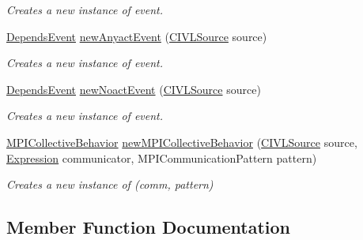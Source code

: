 \begin{DoxyCompactItemize}
\begin{DoxyCompactList}\small\item\em Creates a new instance of {\ttfamily } event. \end{DoxyCompactList}\item 
\hyperlink{interfaceedu_1_1udel_1_1cis_1_1vsl_1_1civl_1_1model_1_1IF_1_1contract_1_1DependsEvent}{Depends\+Event} \hyperlink{classedu_1_1udel_1_1cis_1_1vsl_1_1civl_1_1model_1_1common_1_1contract_1_1CommonContractFactory_a6c45f87fdea960118fca3767f21ee687}{new\+Anyact\+Event} (\hyperlink{interfaceedu_1_1udel_1_1cis_1_1vsl_1_1civl_1_1model_1_1IF_1_1CIVLSource}{C\+I\+V\+L\+Source} source)
\begin{DoxyCompactList}\small\item\em Creates a new instance of {\ttfamily } event. \end{DoxyCompactList}\item 
\hyperlink{interfaceedu_1_1udel_1_1cis_1_1vsl_1_1civl_1_1model_1_1IF_1_1contract_1_1DependsEvent}{Depends\+Event} \hyperlink{classedu_1_1udel_1_1cis_1_1vsl_1_1civl_1_1model_1_1common_1_1contract_1_1CommonContractFactory_a55afb1244554d09602b70b8c064afbd2}{new\+Noact\+Event} (\hyperlink{interfaceedu_1_1udel_1_1cis_1_1vsl_1_1civl_1_1model_1_1IF_1_1CIVLSource}{C\+I\+V\+L\+Source} source)
\begin{DoxyCompactList}\small\item\em Creates a new instance of {\ttfamily } event. \end{DoxyCompactList}\item 
\hyperlink{interfaceedu_1_1udel_1_1cis_1_1vsl_1_1civl_1_1model_1_1IF_1_1contract_1_1MPICollectiveBehavior}{M\+P\+I\+Collective\+Behavior} \hyperlink{classedu_1_1udel_1_1cis_1_1vsl_1_1civl_1_1model_1_1common_1_1contract_1_1CommonContractFactory_a3b630c58c9bce66ec6e1431b546fb20c}{new\+M\+P\+I\+Collective\+Behavior} (\hyperlink{interfaceedu_1_1udel_1_1cis_1_1vsl_1_1civl_1_1model_1_1IF_1_1CIVLSource}{C\+I\+V\+L\+Source} source, \hyperlink{interfaceedu_1_1udel_1_1cis_1_1vsl_1_1civl_1_1model_1_1IF_1_1expression_1_1Expression}{Expression} communicator, M\+P\+I\+Communication\+Pattern pattern)
\begin{DoxyCompactList}\small\item\em Creates a new instance of {\ttfamily (comm, pattern)} \end{DoxyCompactList}\end{DoxyCompactItemize}


\subsection{Member Function Documentation}
\hypertarget{classedu_1_1udel_1_1cis_1_1vsl_1_1civl_1_1model_1_1common_1_1contract_1_1CommonContractFactory_a6c45f87fdea960118fca3767f21ee687}{}
